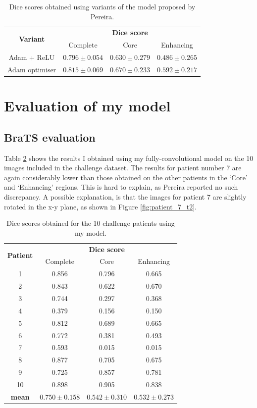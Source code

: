 \documentclass[12pt,a4paper,twoside,openright]{report}
\begin{document}
\begin{table}
\centering	
\begin{tabular}{ c | c c c} 
\multirow{2}{*}{\textbf{Variant}} & \multicolumn{3}{c}{\textbf{Dice score}} \\
 & Complete & Core & Enhancing \\
 \hline
Adam + ReLU & $0.796 \pm 0.054$ & $0.630 \pm 0.279$ & $0.486 \pm 0.265$ \\
Adam optimiser & $0.815 \pm 0.069$ & $0.670 \pm 0.233$ & $0.592 \pm 0.217$ \\
\end{tabular}
\caption{Dice scores obtained using variants of the model proposed by Pereira.}
\label{table:variants_dice_results}
\end{table}


\section{Evaluation of my model}
\subsection{BraTS evaluation}
Table \ref{table:my_model_dice_results} shows the results I obtained using my fully-convolutional model on the 10 images included in the challenge dataset. The results for patient number 7 are again considerably lower than those obtained on the other patients in the `Core' and `Enhancing' regions. This is hard to explain, as Pereira reported no such discrepancy. A possible explanation, is that the images for patient 7 are slightly rotated in the x-y plane, as shown in Figure \ref{fig:patient_7_t2}.

\begin{table}
\centering	
\begin{tabular}{ c | c c c} 
\multirow{2}{*}{\textbf{Patient}} & \multicolumn{3}{c}{\textbf{Dice score}} \\
 & Complete & Core & Enhancing \\
 \hline
1 & 0.856 & 0.796 & 0.665 \\
2 & 0.843 & 0.622 & 0.670 \\
3 & 0.744 & 0.297 & 0.368 \\
4 & 0.379 & 0.156 & 0.150 \\
5 & 0.812 & 0.689 & 0.665 \\
6 & 0.772 & 0.381 & 0.493 \\
7 & 0.593 & 0.015 & 0.015 \\
8 & 0.877 & 0.705 & 0.675 \\
9 & 0.725 & 0.857 & 0.781 \\
10 & 0.898 & 0.905 & 0.838 \\
\textbf{mean} & $0.750 \pm 0.158$ & $0.542 \pm 0.310$ & $0.532 \pm 0.273$
\end{tabular}
\caption{Dice scores obtained for the 10 challenge patients using my model.}
\label{table:my_model_dice_results}
\end{table}
\end{document}

